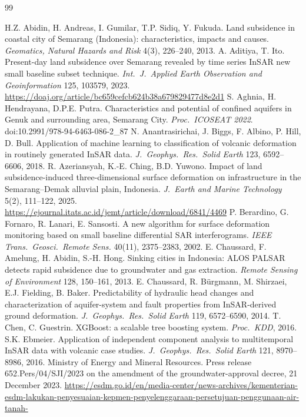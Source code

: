 \begin{thebibliography}{99}\small\raggedright
{} H.Z. Abidin, H. Andreas, I. Gumilar, T.P. Sidiq, Y. Fukuda. Land subsidence in coastal city of Semarang (Indonesia): characteristics, impacts and causes. \emph{Geomatics, Natural Hazards and Risk} 4(3), 226--240, 2013.
 A. Aditiya, T. Ito. Present-day land subsidence over Semarang revealed by time series InSAR new small baseline subset technique. \emph{Int.\ J.\ Applied Earth Observation and Geoinformation} 125, 103579, 2023. \url{https://doaj.org/article/bc659cefcb624b38a679829477d8e2d1}
 S. Aghnia, H. Hendrayana, D.P.E. Putra. Characteristics and potential of confined aquifers in Genuk and surrounding area, Semarang City. \emph{Proc.\ ICOSEAT 2022}. doi:10.2991/978-94-6463-086-2\_87
 N. Anantrasirichai, J. Biggs, F. Albino, P. Hill, D. Bull. Application of machine learning to classification of volcanic deformation in routinely generated InSAR data. \emph{J.\ Geophys.\ Res.\ Solid Earth} 123, 6592--6606, 2018.
 R. Azeriansyah, K.-E. Ching, B.D. Yuwono. Impact of land subsidence-induced three-dimensional surface deformation on infrastructure in the Semarang--Demak alluvial plain, Indonesia. \emph{J.\ Earth and Marine Technology} 5(2), 111--122, 2025. \url{https://ejournal.itats.ac.id/jemt/article/download/6841/4469}
 P. Berardino, G. Fornaro, R. Lanari, E. Sansosti. A new algorithm for surface deformation monitoring based on small baseline differential SAR interferograms. \emph{IEEE Trans.\ Geosci.\ Remote Sens.} 40(11), 2375--2383, 2002.
 E. Chaussard, F. Amelung, H. Abidin, S.-H. Hong. Sinking cities in Indonesia: ALOS PALSAR detects rapid subsidence due to groundwater and gas extraction. \emph{Remote Sensing of Environment} 128, 150--161, 2013.
 E. Chaussard, R. B\"urgmann, M. Shirzaei, E.J. Fielding, B. Baker. Predictability of hydraulic head changes and characterization of aquifer-system and fault properties from InSAR-derived ground deformation. \emph{J.\ Geophys.\ Res.\ Solid Earth} 119, 6572--6590, 2014.
 T. Chen, C. Guestrin. XGBoost: a scalable tree boosting system. \emph{Proc.\ KDD}, 2016.
 S.K. Ebmeier. Application of independent component analysis to multitemporal InSAR data with volcanic case studies. \emph{J.\ Geophys.\ Res.\ Solid Earth} 121, 8970--8986, 2016.
 Ministry of Energy and Mineral Resources. Press release 652.Pers/04/SJI/2023 on the amendment of the groundwater-approval decree, 21 December 2023. \url{https://esdm.go.id/en/media-center/news-archives/kementerian-esdm-lakukan-penyesuaian-kepmen-penyelenggaraan-persetujuan-penggunaan-air-tanah-}

\end{thebibliography}
